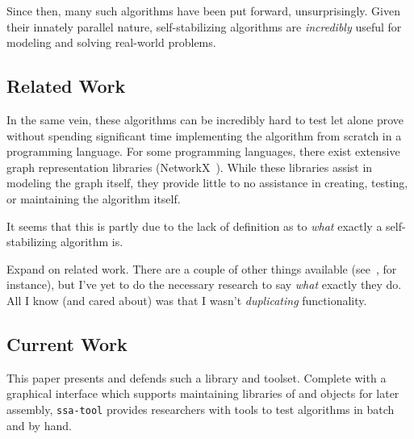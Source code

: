 Since then, many such algorithms have been put forward, unsurprisingly.
Given their innately parallel nature,
  self-stabilizing algorithms are \emph{incredibly} useful
  for modeling and solving real-world problems.

\subsection{Related Work}
\label{sec:introduction:related-work}
In the same vein, these algorithms can be incredibly hard to test
  \Dash let alone prove \Dash
  without spending significant time implementing the algorithm
  from scratch in a programming language.
For some programming languages,
  there exist extensive graph representation libraries (\eg NetworkX~\autocite{hagberg:networkx}).
While these libraries assist in modeling the graph itself,
  they provide little to no assistance in creating, testing, or maintaining the algorithm itself.

It seems that this is partly due to the lack of definition as to \emph{what} exactly a self-stabilizing algorithm is.

\begin{draftvspace}{5in}
  Expand on related work.
  There are a couple of other things available (see~\autocite{lafon:libcircle}, for instance),
    but I've yet to do the necessary research to say \emph{what} exactly they do.
  All I know (and cared about) was that I wasn't \emph{duplicating} functionality.
\end{draftvspace}

\subsection{Current Work}
\label{sec:introduction:current-work}
This paper presents and defends such a library and toolset.
Complete with a graphical interface which supports
  maintaining libraries of  and  objects for later assembly,
  \texttt{ssa-tool} provides researchers with tools to test algorithms in batch and by hand.

